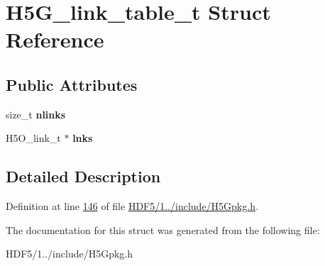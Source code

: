 \hypertarget{struct_h5_g__link__table__t}{}\section{H5\+G\+\_\+link\+\_\+table\+\_\+t Struct Reference}
\label{struct_h5_g__link__table__t}
\subsection*{Public Attributes}
\begin{DoxyCompactItemize}
\item 
\mbox{\label{struct_h5_g__link__table__t_abac4838a20d920af63b95a76a5795792}} 
size\+\_\+t {\bfseries nlinks}
\item 
\mbox{\label{struct_h5_g__link__table__t_ab50600540f5ed73356df0e1363c4df28}} 
H5\+O\+\_\+link\+\_\+t $\ast$ {\bfseries lnks}
\end{DoxyCompactItemize}


\subsection{Detailed Description}


Definition at line \hyperlink{_h_d_f5_21_810_81_2include_2_h5_gpkg_8h_source_l00146}{146} of file \hyperlink{_h_d_f5_21_810_81_2include_2_h5_gpkg_8h_source}{H\+D\+F5/1../include/\+H5\+Gpkg.\+h}.



The documentation for this struct was generated from the following file\+:\begin{DoxyCompactItemize}
\item 
H\+D\+F5/1../include/\+H5\+Gpkg.\+h\end{DoxyCompactItemize}
